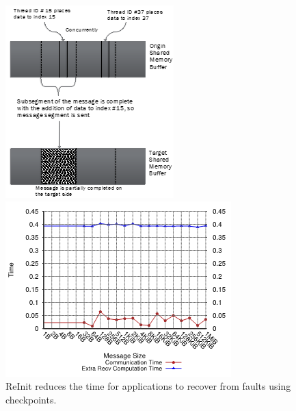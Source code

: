 \begin{figure}
\centering
\begin{minipage}[c]{0.20\textwidth}
\captionsetup{width=\textwidth,font=small,labelfont=bf} %
\caption{ReInit reduces the time for applications to recover from faults using checkpoints.}
\label{fig:reinit}
\end{minipage}
\qquad
\begin{minipage}[c]{0.20\textwidth}
\includegraphics[width=\textwidth]{projects/2.3.1-PMR/2.3.1.17-OMPI-X/partitioned-communications-partial-sends.png}
\end{minipage}
\qquad
\begin{minipage}[c]{0.33\textwidth}
\includegraphics[width=\textwidth]{projects/2.3.1-PMR/2.3.1.17-OMPI-X/partitioned-communications-early-receive.png}
\end{minipage}
\end{figure}

